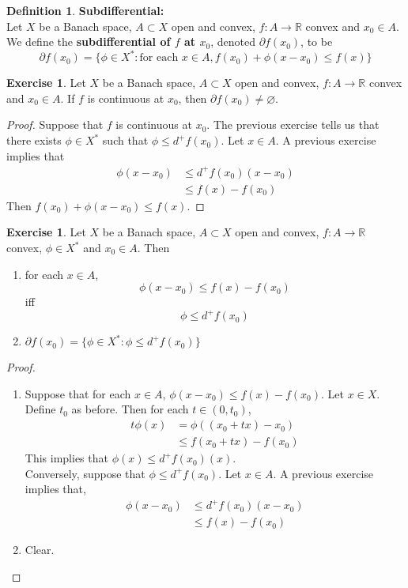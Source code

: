 \documentclass[12pt]{amsart}
\theoremstyle{definition}
\newtheorem{defn}[definition]{Definition}
\newtheorem{ex}[definition]{Exercise}
\newcommand{\R}{\mathbb{R}}
\newcommand{\tbf}[1]{\textbf{#1}}
\newcommand{\p}{\partial}
\DeclareMathOperator*{\0}{\mbf{0}}
\DeclareMathOperator*{\1}{\mbf{1}}
\newcommand{\lex}[1]{\label{ex:#1}}
\newcommand{\ld}[1]{\label{defn:#1}}
\begin{document}
	\begin{defn} \ld{}\tbf{Subdifferential:}\\
	Let $X$ be a Banach space, $A \subset X$ open and convex, $f:A \rightarrow \R$ convex and $x_0 \in A$. We define the \tbf{subdifferential of $f$ at $x_0$}, denoted $\p f(x_0)$, to be $$\p f(x_0) = \{ \phi \in X^*: \text{for each } x \in A, f(x_0) + \phi(x-x_0) \leq f(x)\}$$
	\end{defn}
	
	\begin{ex} \lex{}
	Let $X$ be a Banach space, $A \subset X$ open and convex, $f:A \rightarrow \R$ convex and $x_0 \in A$. If $f$ is continuous at $x_0$, then $\p f(x_0) \neq \varnothing$.
	\end{ex}
	
	\begin{proof}
	Suppose that $f$ is continuous at $x_0$. The previous exercise tells us that there exists $\phi \in X^*$ such that $\phi \leq d^+f(x_0)$. Let $x \in A$. A previous exercise implies that
	\begin{align*}
	\phi(x-x_0) 
	& \leq d^+f(x_0)(x - x_0) \\
	& \leq f(x) - f(x_0)
	\end{align*}
	Then $f(x_0) + \phi(x-x_0) \leq f(x)$.
	\end{proof}
	
	\begin{ex} \lex{}
	Let $X$ be a Banach space, $A \subset X$ open and convex, $f:A \rightarrow \R$ convex, $\phi \in X^*$ and $x_0 \in A$. Then 
	\begin{enumerate}
	\item for each $x \in A$, $$\phi(x-x_0) \leq f(x) - f(x_0)$$ iff  $$\phi \leq d^+f(x_0)$$ 
	\item  $\p f(x_0) = \{ \phi \in X^*: \phi \leq d^+ f(x_0)\}$
	\end{enumerate}
	\end{ex}	
	
	\begin{proof}\
	\begin{enumerate}
	\item Suppose that for each $x \in A$, $\phi(x-x_0) \leq f(x) - f(x_0)$. Let $x \in X$. Define $t_0$ as before. Then for each $t \in (0, t_0)$, 
	\begin{align*}
	t\phi(x)
	&= \phi((x_0 + tx) - x_0) \\
	& \leq f(x_0 + tx) - f(x_0)
	\end{align*}	 
	This implies that $\phi(x) \leq d^+f(x_0)(x)$.\\
	Conversely, suppose that $\phi \leq d^+f(x_0)$. Let $x \in A$. A previous exercise implies that, 
	\begin{align*}
	\phi(x-x_0) 
	& \leq d^+f(x_0)(x-x_0) \\
	&\leq f(x) - f(x_0)
	\end{align*}
	\item Clear.
	\end{enumerate}
	\end{proof}
	
\end{document}
